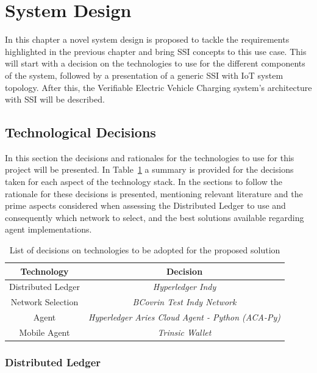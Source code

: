 \section{System Design} 
\label{section:design_and_implementation}

In this chapter a novel system design is proposed to tackle the requirements highlighted in the previous chapter and bring SSI concepts to this use case. This will start with a decision on the technologies to use for the different components of the system, followed by a presentation of a generic SSI with IoT system topology. After this, the Verifiable Electric Vehicle Charging system's architecture with SSI will be described.

\subsection{Technological Decisions}

In this section the decisions and rationales for the technologies to use for this project will be presented. In Table~\ref{tab:final_tech_stack} a summary is provided for the decisions taken for each aspect of the technology stack. In the sections to follow the rationale for these decisions is presented, mentioning relevant literature and the prime aspects considered when assessing the Distributed Ledger to use and consequently which network to select, and the best solutions available regarding agent implementations.

\begin{table}[!htb]
    \centering
    \begin{tabular}{|c|c|}
    \hline
        \textbf{Technology} & \textbf{Decision} \\
        \hline
         Distributed Ledger & \textit{Hyperledger Indy} \\
         Network Selection & \textit{BCovrin Test Indy Network} \\
         Agent & \textit{Hyperledger Aries Cloud Agent - Python (ACA-Py)} \\
         Mobile Agent & \textit{Trinsic Wallet}\\
         \hline
    \end{tabular}
    \caption{List of decisions on technologies to be adopted for the proposed solution}
    \label{tab:final_tech_stack}
\end{table}

\subsubsection{Distributed Ledger}
\label{subsubsec:distributed_Ledger}

